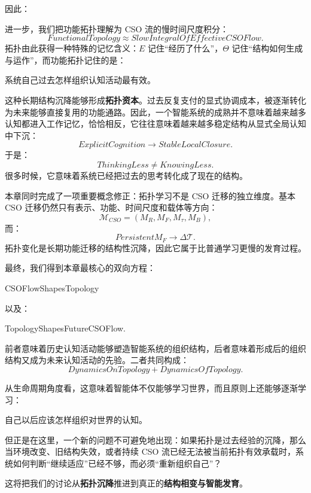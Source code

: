 因此：
\begin{statementbox}
\centering
{}
\end{statementbox}

进一步，我们把功能拓扑理解为 CSO 流的慢时间尺度积分：
\[
\boxed{
FunctionalTopology
\approx
SlowIntegralOfEffectiveCSOFlow.
}
\]
拓扑由此获得一种特殊的记忆含义：$E$ 记住``经历了什么''，$\Theta$ 记住``结构如何生成与运作''，而功能拓扑记住的是：
\begin{statementbox}
系统自己过去怎样组织认知活动最有效。
\end{statementbox}

这种长期结构沉降能够形成\textbf{拓扑资本}。过去反复支付的显式协调成本，被逐渐转化为未来能够直接复用的功能通路。因此，一个智能系统的成熟并不意味着越来越多认知都进入工作记忆，恰恰相反，它往往意味着越来越多稳定结构从显式全局认知中下沉：
\[
ExplicitCognition
\rightarrow
StableLocalClosure.
\]
于是：
\[
\boxed{
ThinkingLess
\neq
KnowingLess.
}
\]
很多时候，它意味着系统已经把过去的思考转化成了现在的结构。

本章同时完成了一项重要概念修正：拓扑学习不是 CSO 迁移的独立维度。基本 CSO 迁移仍然只有表示、功能、时间尺度和载体等方向：
\[
\mathcal M_{CSO}
=
(M_R,M_F,M_\tau,M_B),
\]
而：
\[
\boxed{
PersistentM_F
\rightarrow
\Delta\mathcal T.
}
\]
拓扑变化是长期功能迁移的结构性沉降，因此它属于比普通学习更慢的发育过程。

最终，我们得到本章最核心的双向方程：
\begin{statementbox}
CSOFlowShapesTopology
\end{statementbox}
以及：
\begin{statementbox}
TopologyShapesFutureCSOFlow.
\end{statementbox}
前者意味着历史认知活动能够塑造智能系统的组织结构，后者意味着形成后的组织结构又成为未来认知活动的先验。二者共同构成：
\[
\boxed{
DynamicsOnTopology
+
DynamicsOfTopology.
}
\]

从生命周期角度看，这意味着智能体不仅能够学习世界，而且原则上还能够逐渐学习：
\begin{proposition*}
自己以后应该怎样组织对世界的认知。
\end{proposition*}

但正是在这里，一个新的问题不可避免地出现：如果拓扑是过去经验的沉降，那么当环境改变、旧结构失效，或者持续 CSO 流已经无法被当前拓扑有效承载时，系统如何判断``继续适应''已经不够，而必须``重新组织自己''？

这将把我们的讨论从\textbf{拓扑沉降}推进到真正的\textbf{结构相变与智能发育}。
